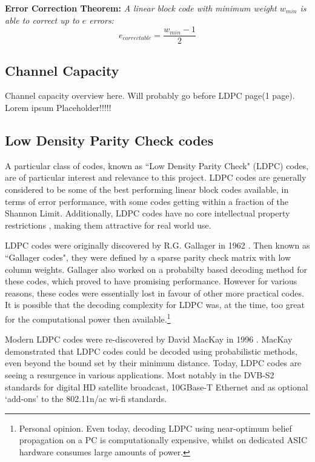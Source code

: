 \documentclass[11pt]{article}
\numberwithin{equation}{subsection}
\begin{document}
\noindent
\textbf{Error Correction Theorem:}
\textit{A linear block code with minimum weight $w_{min}$ is able to correct up to $e$ errors:}
\begin{equation}
e_{correctable} = \dfrac{w_{min} - 1}{2}
\end{equation}

\subsection{Channel Capacity}

Channel capacity overview here. Will probably go before LDPC page(1 page). Lorem ipsum  Placeholder!!!!!

\subsection{Low Density Parity Check codes}
A particular class of codes, known as ``Low Density Parity Check" (LDPC) codes, are of particular interest and relevance to this project. LDPC codes are generally considered to be some of the best performing linear block codes available, in terms of error performance, with some codes getting within a fraction of the Shannon Limit. Additionally, LDPC codes have no core intellectual property restrictions \cite[p.90]{coon15}, making them attractive for real world use.

LDPC codes were originally discovered by R.G. Gallager in 1962 \cite{gallager1962low}. Then known as ``Gallager codes", they were defined by a sparse parity check matrix with low column weights. Gallager also worked on a probabilty based decoding method for these codes, which proved to have promising performance. However for various reasons, these codes were essentially lost in favour of other more practical codes. It is possible that the decoding complexity for LDPC was, at the time, too great for the computational power then available.\footnote{Personal opinion. Even today, decoding LDPC using near-optimum belief propagation on a PC is computationally expensive, whilst on dedicated ASIC hardware consumes large amounts of power.}

Modern LDPC codes were re-discovered by David MacKay in 1996 \cite{mncisit}. MacKay demonstrated that LDPC codes could be decoded using probabilistic methods, even beyond the bound set by their minimum distance. Today, LDPC codes are seeing a resurgence in various applications. Most notably in the DVB-S2 standards for digital HD satellite broadcast, 10GBase-T Ethernet and as optional `add-ons' to the 802.11n/ac wi-fi standards.
\end{document}
